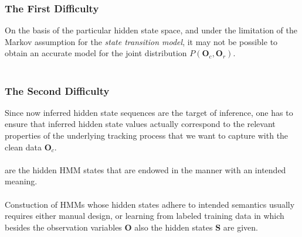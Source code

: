 
\begin{frame}
\frametitle{The First Difficulty}

On the basis of the particular hidden state space, and under the limitation of the Markov assumption for the \emph{state transition model}, it may not be possible to obtain an accurate model for the joint distribution $P(\mathbf{O}_c, \mathbf{O}_r)$.\\~\\

\begin{example}
\end{example}

\end{frame}


\begin{frame}
\frametitle{The Second Difficulty}

Since now inferred hidden state sequences are the target of inference, one has to ensure that inferred hidden state values actually correspond to the relevant properties of the underlying tracking process that we want to capture with the clean data $\mathbf{O}_c$.\\~\\

 are the hidden HMM states that are endowed in the manner with an intended meaning.\\~\\

Constuction of HMMs whose hidden states adhere to intended semantics usually requires either manual design, or learning from labeled training data in which besides the observation variables $\mathbf{O}$ also the hidden states $\mathbf{S}$ are given.

\end{frame}
